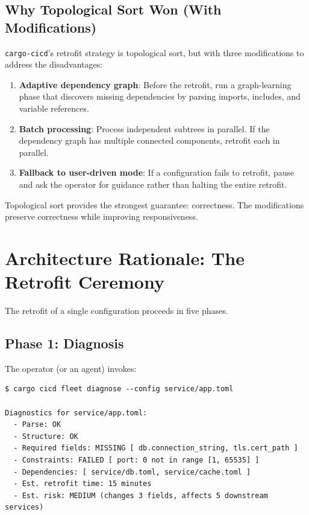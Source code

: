 \subsection{Why Topological Sort Won (With Modifications)}

\texttt{cargo-cicd}'s retrofit strategy is topological sort, but with three modifications to address the disadvantages:

\begin{enumerate}
  \item \textbf{Adaptive dependency graph}: Before the retrofit, run a graph-learning phase that discovers missing dependencies by parsing imports, includes, and variable references.

  \item \textbf{Batch processing}: Process independent subtrees in parallel. If the dependency graph has multiple connected components, retrofit each in parallel.

  \item \textbf{Fallback to user-driven mode}: If a configuration fails to retrofit, pause and ask the operator for guidance rather than halting the entire retrofit.
\end{enumerate}

Topological sort provides the strongest guarantee: correctness. The modifications preserve correctness while improving responsiveness.

\section{Architecture Rationale: The Retrofit Ceremony}

The retrofit of a single configuration proceeds in five phases.

\subsection{Phase 1: Diagnosis}

The operator (or an agent) invokes:

\begin{lstlisting}[caption={Diagnosis phase: assess retrofit feasibility}]
$ cargo cicd fleet diagnose --config service/app.toml

Diagnostics for service/app.toml:
  - Parse: OK
  - Structure: OK
  - Required fields: MISSING [ db.connection_string, tls.cert_path ]
  - Constraints: FAILED [ port: 0 not in range [1, 65535] ]
  - Dependencies: [ service/db.toml, service/cache.toml ]
  - Est. retrofit time: 15 minutes
  - Est. risk: MEDIUM (changes 3 fields, affects 5 downstream services)
\end{lstlisting}


